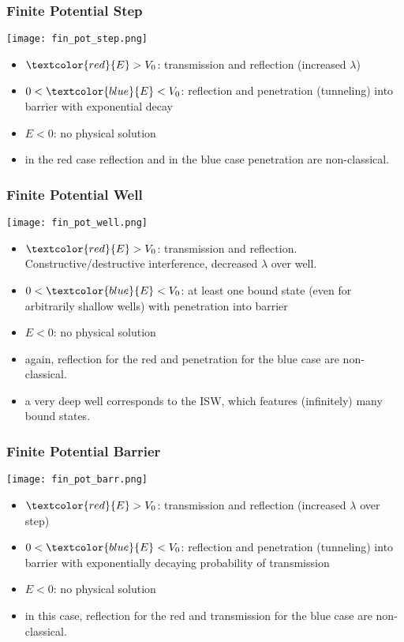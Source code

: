 \subsubsection{Finite Potential Step}
\begin{center}
    \texttt{[image: fin\_pot\_step.png]}
\end{center}
\begin{itemize}
    \item $\textcolor{red}{E}>V_0$: transmission and reflection (increased $\lambda$)
    \item $0<\textcolor{blue}{E}<V_0$: reflection and penetration (tunneling) into barrier with exponential decay
    \item $E<0$: no physical solution
    \item in the red case reflection and in the blue case penetration are non-classical.
\end{itemize}

\subsubsection{Finite Potential Well}
\begin{center}
    \texttt{[image: fin\_pot\_well.png]}
\end{center}
\begin{itemize}
    \item $\textcolor{red}{E}>V_0$: transmission and reflection. Constructive/destructive interference, decreased $\lambda$ over well.
    \item $0<\textcolor{blue}{E}<V_0$: at least one bound state (even for arbitrarily shallow wells) with penetration into barrier
    \item $E<0$: no physical solution
    \item again, reflection for the red and penetration for the blue case are non-classical.
    \item a very deep well corresponds to the ISW, which features (infinitely) many bound states.
\end{itemize}

\subsubsection{Finite Potential Barrier}
\begin{center}
    \texttt{[image: fin\_pot\_barr.png]}
\end{center}
\begin{itemize}
    \item $\textcolor{red}{E}>V_0$: transmission and reflection (increased $\lambda$ over step)
    \item $0<\textcolor{blue}{E}<V_0$: reflection and penetration (tunneling) into barrier with exponentially decaying probability of transmission
    \item $E<0$: no physical solution
    \item in this case, reflection for the red and transmission for the blue case are non-classical.
\end{itemize}

